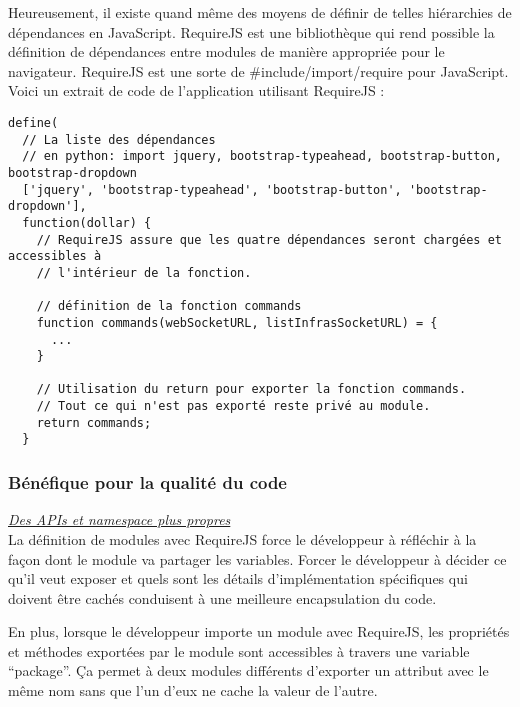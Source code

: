 Heureusement, il existe quand même des moyens de définir de telles hiérarchies de
dépendances en JavaScript. RequireJS est une bibliothèque qui rend possible la
définition de dépendances entre modules de manière appropriée pour le navigateur.
RequireJS est une sorte de \#include/import/require pour JavaScript.\\
Voici un extrait de code de l'application utilisant RequireJS :
\lstset{language=JavaScript}
\begin{lstlisting}[caption=Définition du module commands avec RequireJS]
  define(
  // La liste des dépendances 
  // en python: import jquery, bootstrap-typeahead, bootstrap-button, bootstrap-dropdown
  ['jquery', 'bootstrap-typeahead', 'bootstrap-button', 'bootstrap-dropdown'], 
  function(dollar) { 
    // RequireJS assure que les quatre dépendances seront chargées et accessibles à
    // l'intérieur de la fonction.
    
    // définition de la fonction commands
    function commands(webSocketURL, listInfrasSocketURL) = {
      ...
    }
    
    // Utilisation du return pour exporter la fonction commands.
    // Tout ce qui n'est pas exporté reste privé au module.
    return commands;
  }
\end{lstlisting}




\subsubsection{Bénéfique pour la qualité du code}

\textit{\underline{Des APIs et namespace plus propres}}\\

La définition de modules avec RequireJS force le développeur à réfléchir à la
façon dont le module va partager les variables. Forcer le développeur à décider
ce qu'il veut exposer et quels sont les détails d'implémentation spécifiques
qui doivent être cachés conduisent à une meilleure encapsulation du code.

En plus, lorsque le développeur importe un module avec RequireJS, les propriétés
et méthodes exportées par le module sont accessibles à travers une variable
``package''. Ça permet à deux modules différents d'exporter un attribut avec le
même nom sans que l'un d'eux ne cache la valeur de l'autre.


